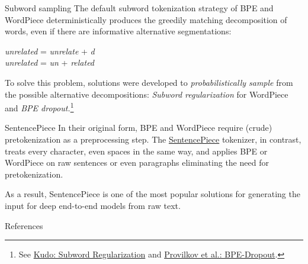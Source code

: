 \documentclass[style=upen, size=14pt]{powerdot}
\theoremstyle{definition}
\begin{document}
\begin{slide}[toc=Subword sampling]{Subword sampling}
  The default subword tokenization strategy of BPE and WordPiece
  deterministically produces the greedily matching decomposition of words, even
  if there are informative alternative segmentations:
  \begin{center}
    \emph{unrelated} = \emph{unrelate} + \emph{d} \\
    \emph{unrelated} = \emph{un} + \emph{related}
  \end{center}
  To solve this problem, solutions were developed to \emph{probabilistically
    sample} from the possible alternative decompositions: \emph{Subword
    regularization} for WordPiece and \emph{BPE dropout.}\footnote{See \href{https://arxiv.org/pdf/1804.10959.pdf}{Kudo: Subword Regularization} and \href{https://arxiv.org/pdf/1910.13267.pdf}{Provilkov et al.: BPE-Dropout}.}
\end{slide}

\begin{slide}[toc=SentencePiece]{SentencePiece}
  In their original form, BPE and WordPiece require (crude) pretokenization as a
  preprocessing step. The
  \href{https://github.com/google/sentencepiece}{SentencePiece} tokenizer, in
  contrast, treats every character, even spaces in the same way, and applies BPE
  or WordPiece on raw sentences or even paragraphs eliminating the need for
  pretokenization.\bigskip

  As a result, SentencePiece is one of the most popular solutions for generating
  the input for deep end-to-end models from raw text.
\end{slide}

\begin{slide}{References}
  \nocite{heinzerling2017bpemb}
  \nocite{jurafsky2019speech}
  \nocite{kudo-2018-subword}
  \nocite{provilkov-etal-2020-bpe} 
  
  \begin{scriptsize}
  
  \end{scriptsize}
\end{slide}
\end{document}
